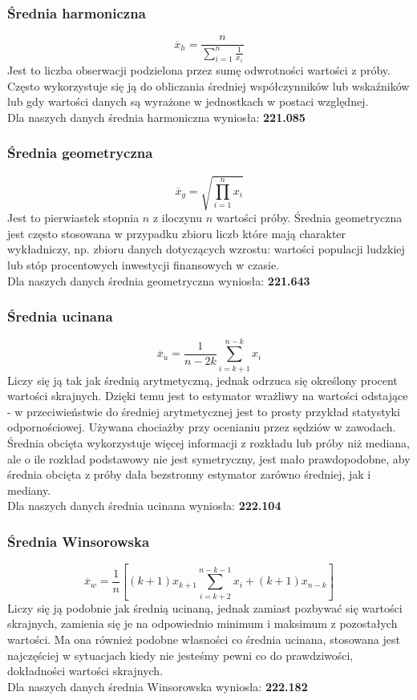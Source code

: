 \documentclass{article}
\theoremstyle{break}
\begin{document}
	\subsubsection*{Średnia harmoniczna}
	$$\overline{x}_h=\frac{n}{\sum\limits_{i=1}^{n}\frac{1}{x_i}}$$
	Jest to liczba obserwacji podzielona przez sumę odwrotności wartości z próby. Często wykorzystuje się ją do obliczania średniej współczynników lub wskaźników lub gdy wartości danych są wyrażone w jednostkach w postaci względnej. \\
	Dla naszych danych średnia harmoniczna wyniosła: \textbf{221.085}
	\subsubsection*{Średnia geometryczna}
	$$\overline{x}_g=\sqrt{\prod\limits_{i=1}^{n}x_i}$$
	Jest to pierwiastek stopnia $n$ z iloczynu $n$ wartości próby. Średnia geometryczna jest często stosowana w przypadku zbioru liczb które mają charakter wykładniczy, np. zbioru danych dotyczących wzrostu: wartości populacji ludzkiej lub stóp procentowych inwestycji finansowych w czasie.\\
	Dla naszych danych średnia geometryczna wyniosła: \textbf{221.643}
	\subsubsection*{Średnia ucinana}
	$$\overline{x}_u=\frac{1}{n-2k}\sum\limits_{i=k+1}^{n-k}x_i$$
	Liczy się ją tak jak średnią arytmetyczną, jednak odrzuca się określony procent wartości skrajnych. Dzięki temu jest to estymator wrażliwy na wartości odstające - w przeciwieństwie do średniej arytmetycznej jest to prosty przykład statystyki odpornościowej. Używana chociażby przy ocenianiu przez sędziów w zawodach. Średnia obcięta wykorzystuje więcej informacji z rozkładu lub próby niż mediana, ale o ile rozkład podstawowy nie jest symetryczny, jest mało prawdopodobne, aby średnia obcięta z próby dała bezstronny estymator zarówno średniej, jak i mediany.\\
	Dla naszych danych średnia ucinana wyniosła: \textbf{222.104}
	\subsubsection*{Średnia Winsorowska}
	$$\overline{x}_w=\frac{1}{n}[(k+1)x_{k+1}\sum\limits_{i=k+2}^{n-k-1}x_i +(k+1)x_{n-k}]$$
	Liczy się ją podobnie jak średnią ucinaną, jednak zamiast pozbywać się wartości skrajnych, zamienia się je na odpowiednio minimum i maksimum z pozostałych wartości. Ma ona również podobne własności co średnia ucinana, stosowana jest najczęściej w sytuacjach kiedy nie jesteśmy pewni co do prawdziwości, dokładności wartości skrajnych.
	\\Dla naszych danych średnia Winsorowska wyniosła: \textbf{222.182}
\end{document}
